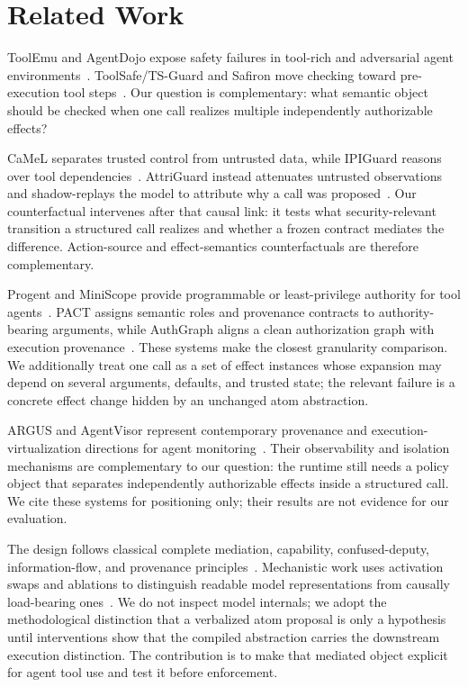 \section{Related Work}

ToolEmu and AgentDojo expose safety failures in tool-rich and adversarial agent environments~\cite{toolemu,agentdojo}. ToolSafe/TS-Guard and Safiron move checking toward pre-execution tool steps~\cite{toolsafe,safiron}. Our question is complementary: what semantic object should be checked when one call realizes multiple independently authorizable effects?

CaMeL separates trusted control from untrusted data, while IPIGuard reasons over tool dependencies~\cite{camel,ipiguard}. AttriGuard instead attenuates untrusted observations and shadow-replays the model to attribute why a call was proposed~\cite{attriguard}. Our counterfactual intervenes after that causal link: it tests what security-relevant transition a structured call realizes and whether a frozen contract mediates the difference. Action-source and effect-semantics counterfactuals are therefore complementary.

Progent and MiniScope provide programmable or least-privilege authority for tool agents~\cite{progent,miniscope}. PACT assigns semantic roles and provenance contracts to authority-bearing arguments, while AuthGraph aligns a clean authorization graph with execution provenance~\cite{pact,authgraph}. These systems make the closest granularity comparison. We additionally treat one call as a set of effect instances whose expansion may depend on several arguments, defaults, and trusted state; the relevant failure is a concrete effect change hidden by an unchanged atom abstraction.

ARGUS and AgentVisor represent contemporary provenance and execution-virtualization directions for agent monitoring~\cite{weng2026argus,ying2026agentvisor}. Their observability and isolation mechanisms are complementary to our question: the runtime still needs a policy object that separates independently authorizable effects inside a structured call. We cite these systems for positioning only; their results are not evidence for our evaluation.

The design follows classical complete mediation, capability, confused-deputy, information-flow, and provenance principles~\cite{saltzer1975protection,dennis1966programming,hardy1988confused,denning1976lattice,buneman2001why,cheney2009provenance}. Mechanistic work uses activation swaps and ablations to distinguish readable model representations from causally load-bearing ones~\cite{anthropicworkspace}. We do not inspect model internals; we adopt the methodological distinction that a verbalized atom proposal is only a hypothesis until interventions show that the compiled abstraction carries the downstream execution distinction. The contribution is to make that mediated object explicit for agent tool use and test it before enforcement.
